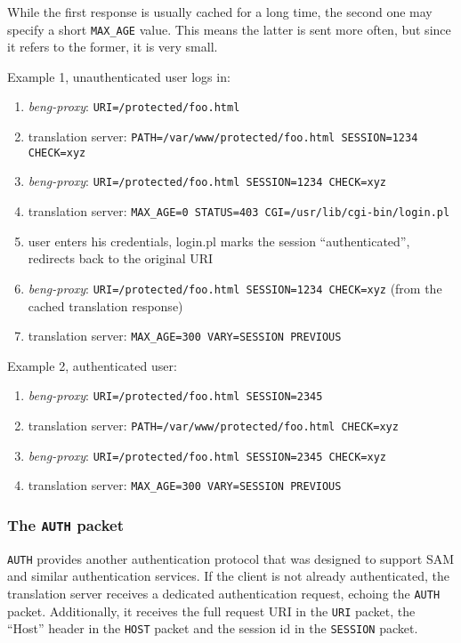 \documentclass[a4paper,12pt]{article}
\begin{document}
While the first response is usually cached for a long time, the second
one may specify a short \texttt{MAX\_AGE} value.  This means the latter
is sent more often, but since it refers to the former, it is very
small.

Example 1, unauthenticated user logs in:

\begin{enumerate}
\item \emph{beng-proxy}: \texttt{URI=/protected/foo.html}
\item translation server: \texttt{PATH=/var/www/protected/foo.html
  SESSION=1234 CHECK=xyz}
\item \emph{beng-proxy}: \texttt{URI=/protected/foo.html SESSION=1234
  CHECK=xyz}
\item translation server: \texttt{MAX\_AGE=0 STATUS=403
  CGI=/usr/lib/cgi-bin/login.pl}
\item user enters his credentials, login.pl marks the session
  ``authenticated'', redirects back to the original URI
\item \emph{beng-proxy}: \texttt{URI=/protected/foo.html SESSION=1234
  CHECK=xyz} (from the cached translation response)
\item translation server: \texttt{MAX\_AGE=300 VARY=SESSION PREVIOUS}
\end{enumerate}

Example 2, authenticated user:

\begin{enumerate}
\item \emph{beng-proxy}: \texttt{URI=/protected/foo.html SESSION=2345}
\item translation server: \texttt{PATH=/var/www/protected/foo.html
  CHECK=xyz}
\item \emph{beng-proxy}: \texttt{URI=/protected/foo.html SESSION=2345
  CHECK=xyz}
\item translation server: \texttt{MAX\_AGE=300 VARY=SESSION PREVIOUS}
\end{enumerate}


\subsubsection{The \texttt{AUTH} packet}
\label{auth}

\texttt{AUTH} provides another authentication protocol that was
designed to support SAM and similar authentication services.  If the
client is not already authenticated, the translation server receives a
dedicated authentication request, echoing the \texttt{AUTH} packet.
Additionally, it receives the full request URI in the \texttt{URI}
packet, the ``Host'' header in the \texttt{HOST} packet and the
session id in the \texttt{SESSION} packet.
\end{document}
